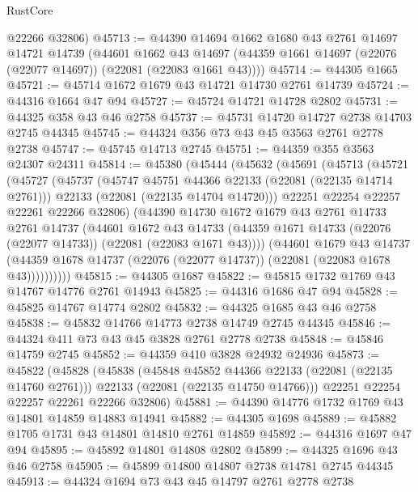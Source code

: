 \begin{lexlean}{RustCore}
\begin{coremodule}
      @22266
      @32806)
@45713 := @44390
    @14694
    @1662
    @1680
    @43
    @2761
    @14697
    @14721
    @14739
    (@44601
      @1662
      @43
      @14697
      (@44359 @1661 @14697 (@22076 (@22077 @14697)) (@22081 (@22083 @1661 @43))))
@45714 := @44305 @1665
@45721 := @45714 @1672 @1679 @43 @14721 @14730 @2761 @14739
@45724 := @44316 @1664 @47 @94
@45727 := @45724 @14721 @14728 @2802
@45731 := @44325 @358 @43 @46 @2758
@45737 := @45731 @14720 @14727 @2738 @14703 @2745 @44345
@45745 := @44324 @356 @73 @43 @45 @3563 @2761 @2778 @2738
@45747 := @45745 @14713 @2745
@45751 := @44359 @355 @3563 @24307 @24311
@45814 := @45380
    (@45444
      (@45632
        (@45691
          (@45713
            (@45721
              (@45727
                (@45737
                  (@45747 @45751 @44366 @22133 (@22081 (@22135 @14714 @2761)))
                  @22133
                  (@22081 (@22135 @14704 @14720)))
                @22251
                @22254
                @22257
                @22261
                @22266
                @32806)
              (@44390
                @14730
                @1672
                @1679
                @43
                @2761
                @14733
                @2761
                @14737
                (@44601
                  @1672
                  @43
                  @14733
                  (@44359 @1671 @14733 (@22076 (@22077 @14733)) (@22081 (@22083 @1671 @43))))
                (@44601
                  @1679
                  @43
                  @14737
                  (@44359 @1678 @14737 (@22076 (@22077 @14737)) (@22081 (@22083 @1678 @43))))))))))
@45815 := @44305 @1687
@45822 := @45815 @1732 @1769 @43 @14767 @14776 @2761 @14943
@45825 := @44316 @1686 @47 @94
@45828 := @45825 @14767 @14774 @2802
@45832 := @44325 @1685 @43 @46 @2758
@45838 := @45832 @14766 @14773 @2738 @14749 @2745 @44345
@45846 := @44324 @411 @73 @43 @45 @3828 @2761 @2778 @2738
@45848 := @45846 @14759 @2745
@45852 := @44359 @410 @3828 @24932 @24936
@45873 := @45822
    (@45828
      (@45838
        (@45848 @45852 @44366 @22133 (@22081 (@22135 @14760 @2761)))
        @22133
        (@22081 (@22135 @14750 @14766)))
      @22251
      @22254
      @22257
      @22261
      @22266
      @32806)
@45881 := @44390 @14776 @1732 @1769 @43 @14801 @14859 @14883 @14941
@45882 := @44305 @1698
@45889 := @45882 @1705 @1731 @43 @14801 @14810 @2761 @14859
@45892 := @44316 @1697 @47 @94
@45895 := @45892 @14801 @14808 @2802
@45899 := @44325 @1696 @43 @46 @2758
@45905 := @45899 @14800 @14807 @2738 @14781 @2745 @44345
@45913 := @44324 @1694 @73 @43 @45 @14797 @2761 @2778 @2738

\end{coremodule}
\end{lexlean}
